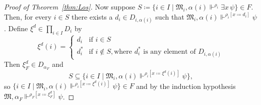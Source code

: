 \documentclass[submission,copyright,creativecommons]{eptcs}
\newcommand{\mo}{\mathfrak}
\newcommand{\satisfySym}{\Vdash}
\newcommand{\satisfy}[4]{#1, #2 \satisfySym^{#4} #3}
\begin{document}
\begin{proof}[Proof of Theorem~\ref{thm:Los}]
    Now suppose
    $S \coloneq \{ i \in I \mid \satisfy{\mo{M}_i}{\alpha(i)}{\exists x\,\psi}{\rho_i}\} \in F$. 
    Then, for every $i \in S$ there exists a $d_i \in D_{i,\alpha(i)}$
    such that $\satisfy{\mo{M}_i}{\alpha(i)}{\psi}{\rho_i[x \coloneq d_i]}$.
    Define $\xi^d \in \prod_{i \in I} D_i$ by
    \begin{equation*}
      \xi^d(i)
        = \begin{cases}
            d_i   &\text{if } i \in S \\
            d^*_i &\text{if } i \not\in S, \text{where } d^*_i \text{ is any element of } D_{i,\alpha(i)}
          \end{cases}
    \end{equation*}
    Then $\xi^d_F \in D_{\alpha_F}$ and
    \begin{equation*}
      S \subseteq \{ i \in I \mid \satisfy{\mo{M}_i}{\alpha(i)}{\psi}{\rho_i[x \coloneq \xi^d(i)]} \},
    \end{equation*}
    so $\{ i \in I \mid \satisfy{\mo{M}_i}{\alpha(i)}{\psi}{\rho_i[x \coloneq \xi^d(i)]} \} \in F$
    and by the induction hypothesis $\satisfy{\mo{M}}{\alpha_F}{\psi}{\rho_F[x \coloneq \xi^d_F]}$.
\end{proof}





\end{document}
